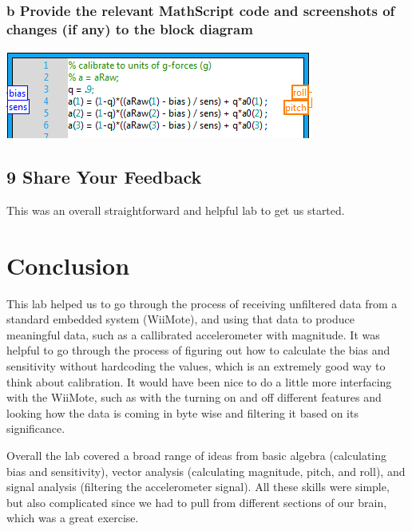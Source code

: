 \documentclass[10pt,a4paper]{article}
\begin{document}
    \subsubsection*{b Provide the relevant MathScript code and screenshots of changes (if any) to the block diagram}
      \includegraphics{../lab1_data/lab1_8a.PNG} 
  \subsection*{9 Share Your Feedback}
    This was an overall straightforward and helpful lab to get us started.
\section*{Conclusion}
  This lab helped us to go through the process of receiving unfiltered data from a standard embedded system (WiiMote), and using that data to produce meaningful data, such as a callibrated accelerometer with magnitude. It was helpful to go through the process of figuring out how to calculate the bias and sensitivity without hardcoding the values, which is an extremely good way to think about calibration. It would have been nice to do a little more interfacing with the WiiMote, such as with the turning on and off different features and looking how the data is coming in byte wise and filtering it based on its significance.
  
  Overall the lab covered a broad range of ideas from basic algebra (calculating bias and sensitivity), vector analysis (calculating magnitude, pitch, and roll), and signal analysis (filtering the accelerometer signal). All these skills were simple, but also complicated since we had to pull from different sections of our brain, which was a great exercise. 
\end{document}
